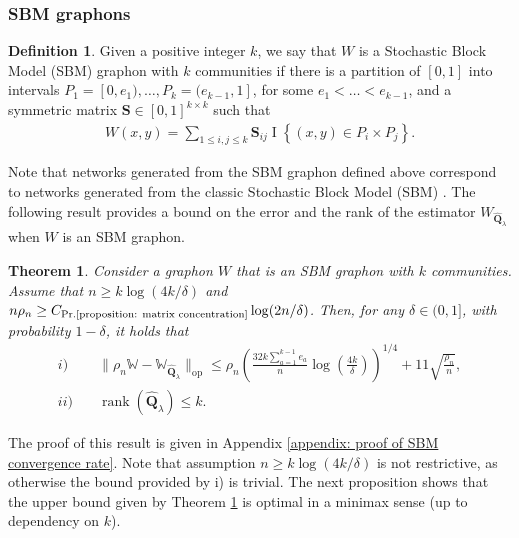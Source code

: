 \documentclass[11pt]{article}
\newcommand{\bQhat}{\widehat{\bm{Q}}}
\newcommand{\opnorm}[1]{\|#1\|_{\mathrm{op}}}
\newcommand{\bbW}{\mathbb{W}}
\newcommand{\bS}{\bm{S}}
\newcommand{\indicator}[1]{{\operatorname{I} \left \{ #1\right \}}}
\newcommand{\constantBandeira}{C_{\text{Pr.\ref{proposition: matrix concentration}}}}
\newcommand{\<}{\langle}
\renewcommand{\>}{\rangle}
\DeclareMathOperator{\rank}{rank}
\theoremstyle{plain}
\newtheorem{theorem}{Theorem}
\theoremstyle{definition}
\newtheorem{definition}{Definition}
\theoremstyle{remark}
\begin{document}
\subsubsection{SBM graphons}\label{sec:SBM}
\begin{definition}
\label{definition: SBM}
Given a positive integer $k$, we say that $W$ is a Stochastic Block Model (SBM) graphon with $k$ communities if there is a partition of $[0, 1]$ into intervals 
$P_1=[0,e_1), \dots, P_k=(e_{k-1},1]$, for some $e_1< \hdots<e_{k-1}$, and a symmetric matrix $\bS \in [0, 1]^{k \times k}$ such that
\begin{align*}
	W(x, y) = \sum_{1 \le i, j \le k} \bS_{ij} \indicator{(x, y) \in P_i \times P_j}.
\end{align*}
\end{definition}
Note that networks generated from the SBM graphon defined above correspond to networks generated from  the classic Stochastic Block Model (SBM) \citep{SBM_holland}.
The following result provides a bound on the error and the rank  of the  estimator $W_{\bQhat_\lambda}$ when $W$  is an SBM graphon.
\begin{theorem}
\label{theorem: SBM convergence rate}
    Consider a graphon $W$ that is an SBM graphon with $k$ communities.  Assume that
    $n \ge k \log (4k/\delta)$ and 
    $n \rho_n \ge \constantBandeira \log (2n/\delta)$. Then, for any $\delta \in (0,1]$, with  probability $1 - \delta$, it holds that
    \begin{align*}
         i) &\quad   \opnorm{\rho_n \bbW - \bbW_{\bQhat_\lambda}} \le
         \rho_n \left (\frac{32 k \sum_{a = 1}^{k - 1} e_a}{n} \log \left(\frac{4k}{\delta}\right)\right )^{1/4} + 11 \sqrt{\frac{\rho_n}{n}}, \\
          ii) &\quad  \rank(\bQhat_{\lambda}) \le k.
    \end{align*}
\end{theorem}
The proof of this result is given in Appendix \ref{appendix: proof of SBM convergence rate}. Note that assumption $n \ge k \log (4k/\delta)$ is not restrictive, as otherwise the bound provided by i) is trivial. The next proposition shows that the upper bound given by Theorem \ref{theorem: SBM convergence rate} is optimal in a minimax sense (up to dependency on $k$). 

\begingroup

\end{document}

